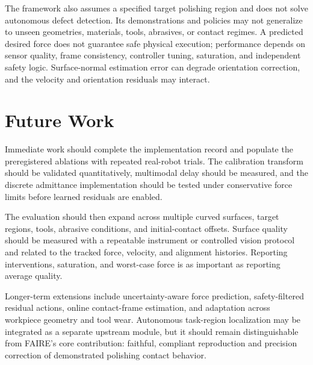 The framework also assumes a specified target polishing region and does not solve autonomous defect detection. Its demonstrations and policies may not generalize to unseen geometries, materials, tools, abrasives, or contact regimes. A predicted desired force does not guarantee safe physical execution; performance depends on sensor quality, frame consistency, controller tuning, saturation, and independent safety logic. Surface-normal estimation error can degrade orientation correction, and the velocity and orientation residuals may interact.

\section{Future Work}
Immediate work should complete the implementation record and populate the preregistered ablations with repeated real-robot trials. The calibration transform should be validated quantitatively, multimodal delay should be measured, and the discrete admittance implementation should be tested under conservative force limits before learned residuals are enabled.

The evaluation should then expand across multiple curved surfaces, target regions, tools, abrasive conditions, and initial-contact offsets. Surface quality should be measured with a repeatable instrument or controlled vision protocol and related to the tracked force, velocity, and alignment histories. Reporting interventions, saturation, and worst-case force is as important as reporting average quality.

Longer-term extensions include uncertainty-aware force prediction, safety-filtered residual actions, online contact-frame estimation, and adaptation across workpiece geometry and tool wear. Autonomous task-region localization may be integrated as a separate upstream module, but it should remain distinguishable from FAIRE's core contribution: faithful, compliant reproduction and precision correction of demonstrated polishing contact behavior.
